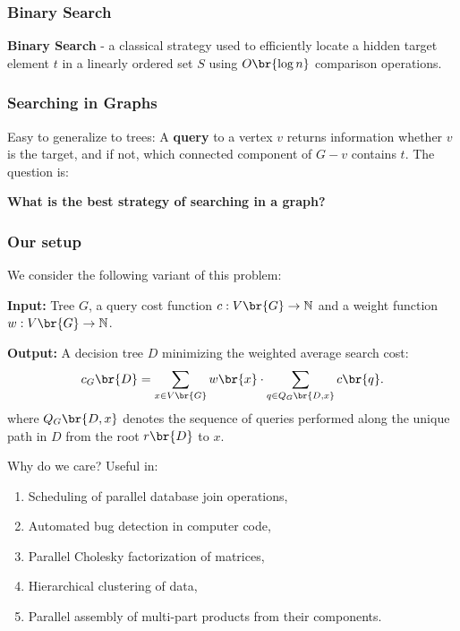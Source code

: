 
\begin{frame}
\frametitle{Binary Search}
\textbf{Binary Search} - a classical strategy used to efficiently locate a hidden target element $t$ in a linearly ordered set $S$ using $O\br{\log n}$ comparison operations.
\pause


\end{frame}

\begin{frame}
\frametitle{Searching in Graphs}
Easy to generalize to trees: A \textbf{query} to a vertex $v$ returns information whether $v$ is the target, and if not, which connected component of $G-v$ contains $t$. The question is: 

\textbf{What is the best strategy of searching in a graph?}
\pause


\end{frame}

\begin{frame}
\frametitle{Our setup}
We consider the following variant of this problem:
\begin{tcolorbox}[colback=white, title=Graph Search Problem (GSP), fonttitle=\bfseries, breakable]
\textbf{Input:} Tree $G$, a query cost function $c:V\br{G}\to \mathbb{N}$ and a weight function $w:V\br{G}\to \mathbb{N}$.

\pause
\textbf{Output:} A decision tree $D$ minimizing the weighted average search cost: 
$$c_G\br{D} = \sum_{x\in V\br{G}}w\br{x}\cdot \sum_{q\in Q_G\br{D, x}}c\br{q}.$$
where $Q_G\br{D,x}$ denotes the sequence of queries performed 
along the unique path in $D$ from the root $r\br{D}$ to $x$.
\end{tcolorbox}
\end{frame}

\begin{frame}{Why do we care?}
    Useful in:
    \begin{enumerate}
        \item Scheduling of parallel database join operations,
        \item Automated bug detection in computer code,
        \item Parallel Cholesky factorization of matrices,
        \item Hierarchical clustering of data,
        \item Parallel assembly of multi-part products from their components.
    \end{enumerate}
\end{frame}

